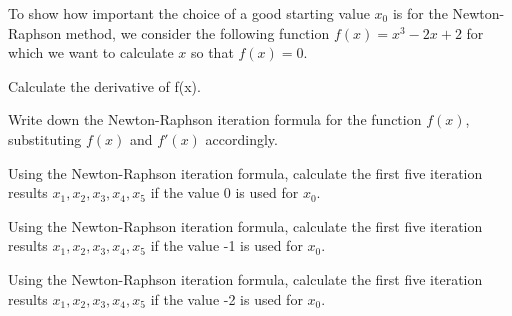 \begin{aufgabe}

To show how important the choice of a good starting value $x_0$ is for the Newton-Raphson method, we consider the following function $f(x)=x^3 - 2x + 2$ for which we want to calculate $x$ so that $f(x)=0$. 

\begin{teilaufgabe}

\item Calculate the derivative of f(x).
\item Write down the Newton-Raphson iteration formula for the function $f(x)$, substituting $f(x)$ and $f'(x)$ accordingly.
\item Using the Newton-Raphson iteration formula, calculate the first five iteration results $x_1, x_2, x_3, x_4, x_5$ if the value 0 is used for $x_0$.
\item Using the Newton-Raphson iteration formula, calculate the first five iteration results $x_1, x_2, x_3, x_4, x_5$ if the value -1 is used for $x_0$.
\item Using the Newton-Raphson iteration formula, calculate the first five iteration results $x_1, x_2, x_3, x_4, x_5$ if the value -2 is used for $x_0$.
\end{teilaufgabe}

\end{aufgabe}




